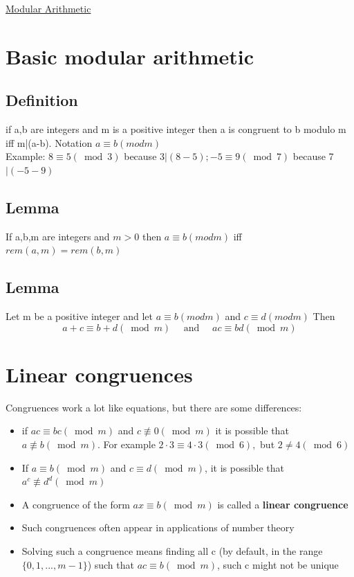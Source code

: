 \documentclass{article}[18pt]
\begin{document}
\begin{center}
\underline{\huge Modular Arithmetic}
\end{center}
\section{Basic modular arithmetic}
\subsection{Definition}
if a,b are integers and m is a positive integer then a is congruent to b modulo m iff m|(a-b). Notation $a\equiv b (mod m)$\\
Example: 8$\equiv 5 ( \bmod 3 )$ because 3$| ( 8 - 5 ) ; - 5 \equiv 9 ( \bmod 7 )$ because 7$| ( - 5 - 9 )$
\subsection{Lemma}
If a,b,m are integers and $m>0$ then $a\equiv b (mod m)$ iff $rem(a,m)=rem(b,m)$
\subsection{Lemma}
Let m be a positive integer and let $a\equiv b (mod m)$ and $c\equiv d (mod m)$ Then
$$a + c \equiv b + d ( \bmod m ) \quad \text { and } \quad a c \equiv b d ( \bmod m )$$
\section{Linear congruences}
Congruences work a lot like equations, but there are some differences:
\begin{itemize}
	\item if $ac\equiv bc (\bmod m)$ and $c \not\equiv 0 (\bmod m)$ it is possible that $a\not\equiv b (\bmod m)$. For example  $2 \cdot 3 \equiv 4 \cdot 3 ( \bmod 6 ) ,$ but $2 \neq 4 ( \bmod 6 )$
	\item If $a\equiv b (\bmod m)$ and $c\equiv d (\bmod m)$, it is possible that $a^c\not\equiv d^d (\bmod m)$
	\item A congruence of the form $ax\equiv b(\bmod m)$ is called a \textbf{linear congruence}
	\item Such congruences often appear in applications of number theory
	\item Solving such a congruence means finding all c (by default, in the range $\{0,1,...,m-1\}$) such that $ac\equiv b (\bmod m)$, such c might not be unique
\end{itemize}
\end{document}
